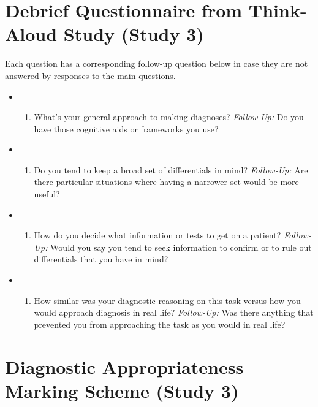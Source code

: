 \documentclass[
]{article}
\providecommand{\tightlist}{%
  \setlength{\itemsep}{0pt}\setlength{\parskip}{0pt}}
\begin{document}
\section{Debrief Questionnaire from Think-Aloud Study (Study
3)}\label{debrief-questionnaire-from-think-aloud-study-study-3}

Each question has a corresponding follow-up question below in case they
are not answered by responses to the main questions.

\begin{itemize}
\tightlist
\item
  \begin{enumerate}
  \def\labelenumi{\arabic{enumi}.}
  \tightlist
  \item
    What's your general approach to making diagnoses? \emph{Follow-Up:}
    Do you have those cognitive aids or frameworks you use?
  \end{enumerate}
\item
  \begin{enumerate}
  \def\labelenumi{\arabic{enumi}.}
  \setcounter{enumi}{1}
  \tightlist
  \item
    Do you tend to keep a broad set of differentials in mind?
    \emph{Follow-Up:} Are there particular situations where having a
    narrower set would be more useful?
  \end{enumerate}
\item
  \begin{enumerate}
  \def\labelenumi{\arabic{enumi}.}
  \setcounter{enumi}{2}
  \tightlist
  \item
    How do you decide what information or tests to get on a patient?
    \emph{Follow-Up:} Would you say you tend to seek information to
    confirm or to rule out differentials that you have in mind?
  \end{enumerate}
\item
  \begin{enumerate}
  \def\labelenumi{\arabic{enumi}.}
  \setcounter{enumi}{3}
  \tightlist
  \item
    How similar was your diagnostic reasoning on this task versus how
    you would approach diagnosis in real life? \emph{Follow-Up:} Was
    there anything that prevented you from approaching the task as you
    would in real life?
  \end{enumerate}
\end{itemize}

\section{Diagnostic Appropriateness Marking Scheme (Study
3)}\label{diagnostic-appropriateness-marking-scheme-study-3}
\end{document}
